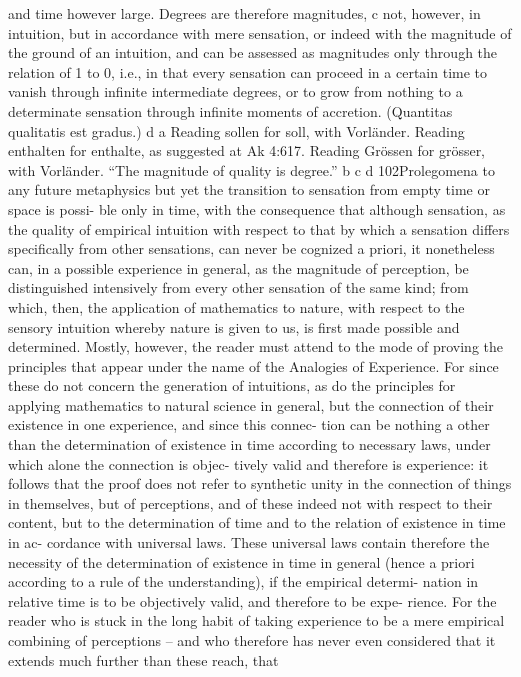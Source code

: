 and time however large. Degrees are therefore magnitudes, c not, however, in
intuition, but in accordance with mere sensation, or indeed with the magnitude
of the ground of an intuition, and can be assessed as magnitudes only through
the relation of 1 to 0, i.e., in that every sensation can proceed in a certain
time to vanish through inﬁnite intermediate degrees, or to grow from nothing
to a determinate sensation through inﬁnite moments of accretion. (Quantitas
qualitatis est gradus.) d
a Reading sollen for soll, with Vorländer.
Reading enthalten for enthalte, as suggested at Ak 4:617.
Reading Grössen for grösser, with Vorländer.
“The magnitude of quality is degree.”
b
c
d
102Prolegomena to any future metaphysics
but yet the transition to sensation from empty time or space is possi-
ble only in time, with the consequence that although sensation, as the
quality of empirical intuition with respect to that by which a sensation
differs speciﬁcally from other sensations, can never be cognized a priori,
it nonetheless can, in a possible experience in general, as the magnitude
of perception, be distinguished intensively from every other sensation
of the same kind; from which, then, the application of mathematics to
nature, with respect to the sensory intuition whereby nature is given to
us, is ﬁrst made possible and determined.
Mostly, however, the reader must attend to the mode of proving the
principles that appear under the name of the Analogies of Experience.
For since these do not concern the generation of intuitions, as do the
principles for applying mathematics to natural science in general, but the
connection of their existence in one experience, and since this connec-
tion can be nothing a other than the determination of existence in time
according to necessary laws, under which alone the connection is objec-
tively valid and therefore is experience: it follows that the proof does not
refer to synthetic unity in the connection of things in themselves, but of
perceptions, and of these indeed not with respect to their content, but to
the determination of time and to the relation of existence in time in ac-
cordance with universal laws. These universal laws contain therefore the
necessity of the determination of existence in time in general (hence a
priori according to a rule of the understanding), if the empirical determi-
nation in relative time is to be objectively valid, and therefore to be expe-
rience. For the reader who is stuck in the long habit of taking experience
to be a mere empirical combining of perceptions – and who therefore has
never even considered that it extends much further than these reach, that
